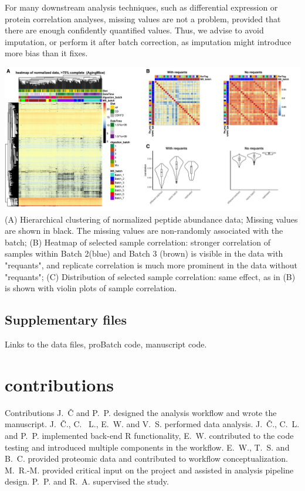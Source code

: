 \documentclass[num-refs]{wiley-article}
\begin{document}
\begin{tcolorbox}
	For many downstream analysis techniques, such as differential expression or protein correlation analyses, missing values are not a problem, provided that there are enough confidently quantified values. Thus, we advise to avoid imputation, or perform it after batch correction, as imputation might introduce more bias than it fixes. 
	
		\begin{minipage}[h]{\linewidth}
			\center
			\includegraphics[width=.9\textwidth]{figures/Fig4_missing_values.pdf}
			\label{fig:batch_fig4_missing_values}
			{\footnotesize  (A) Hierarchical clustering of normalized peptide abundance data; Missing values are shown in black. The missing values are non-randomly associated with the batch;
				(B) Heatmap of selected sample correlation: stronger correlation of samples within Batch 2(blue) and Batch 3 (brown) is visible in the data with "requants", and replicate correlation is much more prominent in the data without "requants";
			(C) Distribution of selected sample correlation: same effect, as in (B) is shown with violin plots of sample correlation.}
		\end{minipage}
\end{tcolorbox}






\subsection*{Supplementary files}
Links to the data files, proBatch code, manuscript code.

\section*{contributions}

Contributions
J.~Č and P.~P. designed the analysis workflow and wrote the manuscript. J.~Č., C. ~L., E.~W. and V.~S. performed data analysis. J.~Č., C.~L. and P.~P. implemented back-end R functionality, E.~W. contributed to the code testing and introduced multiple components in the workflow. E.~W., T.~S. and B.~C. provided proteomic data and contributed to workflow conceptualization. M.~R.-M. provided critical input on the project and assisted in analysis pipeline design. P.~P. and R.~A. supervised the study.
\end{document}
